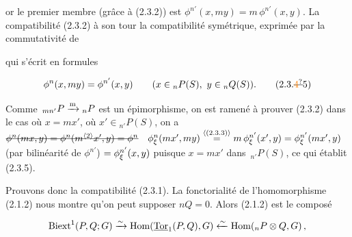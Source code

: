 or le premier membre (grâce à (2.3.2)) est $\phi^{n'}(x,my)=m\,\phi^{n'}(x,y)$. La compatibilité  (2.3.2)  à son tour  la compatibilité symétrique, exprimée par la commutativité de


qui s'écrit en formules

\[\phi^n(x,my)=\phi^{n'}(x,y)\qquad (x\in{}_nP(S),\ y\in{}_nQ(S)).\tag*{(2.3.\deleted{\unsure{4}}5)}\]

 Comme $\,{}_{mn'}P\xrightarrow{\mathrm m}{}_nP$ est un épimorphisme, on est ramené à prouver (2.3.2) dans le cas où $x=mx'$, où $x'\in{}_{n'}P(S)$,  on a $\deleted{\phi^n(mx,y)=\phi^n(m^{\inserted{\handwritten{2}}}x',y)=\phi^n}\quad\phi_{\handwritten{\xi}}^n(mx',my)\overset{\inserted{\text{(2.3.3)}}}{=}m\,\phi_{\handwritten{\xi}}^{n\handwritten{'}}(x',y)=\phi_{\handwritten{\xi}}^{n'}(mx',y)$ (par bilinéarité de $\phi^{n'}$) $=\phi_{\xi}^{n'}(x,y)$ puisque $x=mx'$ dans $\,{}_{n'}P(S)$, ce qui établit (2.3.5).

Prouvons donc la compatibilité (2.3.1). La fonctorialité de l'homomorphisme (2.1.2) nous montre qu'on peut supposer $nQ=0$. Alors (2.1.2) est le composé

\[\mathrm{Biext}^1(P,Q;G)\xrightarrow{\sim}\mathrm{Hom}(\underline{\mathrm{Tor}}_1(P,Q),G)\xleftarrow{\sim}\mathrm{Hom}({}_nP\otimes Q,G)\,,\]


